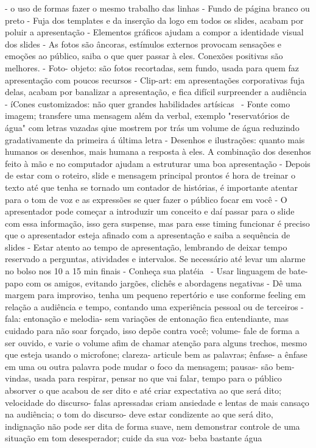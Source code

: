 \begin{itemize}
- o uso de formas fazer o mesmo trabalho das linhas
- Fundo de página branco ou preto
- Fuja dos templates e da inserção da logo em todos os slides, acabam por poluir a apresentação
- Elementos gráficos ajudam a compor a identidade visual dos slides
- As fotos são âncoras, estímulos externos provocam sensações e emoções ao público, saiba o que quer passar à eles. Conexões positivas são melhores.
- Foto- objeto: são fotos recortadas, sem fundo, usada para quem faz apresentação com poucos recursos
- Clip-art: em apresentações corporativas fuja delas, acabam por banalizar a apresentação, e fica difícil surpreender a audiência
- íCones customizados: não quer grandes habilidades artísicas 
- Fonte como imagem; transfere uma mensagem além da verbal, exemplo "reservatórios de água" com letras vazadas qiue mostrem por trás um volume de água reduzindo gradativamente da primeira á última letra
- Desenhos e ilustrações: quanto mais humanos os desenhos, mais humana a resposta à eles. A combinação dos desenhos feito à mão e no computador ajudam a estruturar uma boa apresentação
- Depois de estar com o roteiro, slide e mensagem principal prontos é hora de treinar o texto até que tenha se tornado um contador de histórias, é importante atentar para o tom de voz e as expressões se quer fazer o público focar em você
- O apresentador pode começar a introduzir um conceito e daí passar para o slide com essa informação, isso gera suspense, mas para esse timing funcionar é preciso que o apresentador esteja afinado com a apresentação e saiba a sequência de slides
- Estar atento ao tempo de apresentação, lembrando de deixar tempo reservado a perguntas, atividades e intervalos. Se necessário até levar um alarme no bolso nos 10 a 15 min finais
- Conheça sua platéia 
- Usar linguagem de bate-papo com os amigos, evitando jargões, clichês e abordagens negativas
- Dê uma margem para improviso, tenha um pequeno repertório e use conforme feeling em relação a audiência e tempo, contando uma experiência pessoal ou de terceiros
- fala: entonação e melodia- sem variações de entonação fica entendiante, mas cuidado para não soar forçado, isso depõe contra você; volume- fale de forma a ser ouvido, e varie o volume afim de chamar atenção para alguns trechos, mesmo que esteja usando o microfone; clareza- articule bem as palavras; ênfase- a ênfase em uma ou outra palavra pode mudar o foco da mensagem; pausas- são bem-vindas, usada para respirar, pensar no que vai falar, tempo para o público absorver o que acabou de ser dito e até criar expectativa ao que será dito; velocidade do discurso- falas apressadas criam ansiedade e lentas de mais cansaço na audiência; o tom do discurso- deve estar condizente ao que será dito, indignação não pode ser dita de forma suave, nem demonstrar controle de uma situação em tom desesperador; cuide da sua voz- beba bastante água  

\end{itemize}
